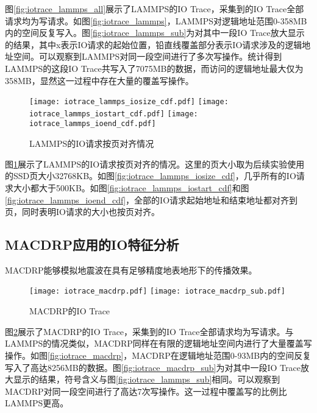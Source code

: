 图\ref{fig:iotrace_lammps_all}展示了LAMMPS的IO Trace，采集到的IO Trace全部请求均为写请求。如图\ref{fig:iotrace_lammps}，LAMMPS对逻辑地址范围0-358MB内的空间反复写入。图\ref{fig:iotrace_lammps_sub}为对其中一段IO Trace放大显示的结果，其中x表示IO请求的起始位置，铅直线覆盖部分表示IO请求涉及的逻辑地址空间。可以观察到LAMMPS对同一段空间进行了多次写操作。统计得到LAMMPS的这段IO Trace共写入了7075MB的数据，而访问的逻辑地址最大仅为358MB，显然这一过程中存在大量的覆盖写操作。

\begin{figure}[H]
  \centering
    {\texttt{[image: iotrace\_lammps\_iosize\_cdf.pdf]}}
  \hspace{1em}
      {\texttt{[image: iotrace\_lammps\_iostart\_cdf.pdf]}}
      \hspace{1em}
          {\texttt{[image: iotrace\_lammps\_ioend\_cdf.pdf]}}
  \caption{LAMMPS的IO请求按页对齐情况}
  \label{fig:iotrace_lammps_iocdf}
\end{figure}
图\ref{fig:iotrace_lammps_iocdf}展示了LAMMPS的IO请求按页对齐的情况。这里的页大小取为后续实验使用的SSD页大小32768KB。如图\ref{fig:iotrace_lammps_iosize_cdf}，几乎所有的IO请求大小都大于500KB。如图\ref{fig:iotrace_lammps_iostart_cdf}和图\ref{fig:iotrace_lammps_ioend_cdf}，全部的IO请求起始地址和结束地址都对齐到页，同时表明IO请求的大小也按页对齐。

\subsection{MACDRP应用的IO特征分析}
\label{ssc:ioana}
MACDRP能够模拟地震波在具有足够精度地表地形下的传播效果。
\begin{figure}[H]
  \centering
    {\texttt{[image: iotrace\_macdrp.pdf]}}
  \hspace{4em}
      {\texttt{[image: iotrace\_macdrp\_sub.pdf]}}
  \caption{MACDRP的IO Trace}
  \label{fig:iotrace_macdrp_all}
\end{figure}
图\ref{fig:iotrace_macdrp_all}展示了MACDRP的IO Trace，采集到的IO Trace全部请求均为写请求。与LAMMPS的情况类似，MACDRP同样在有限的逻辑地址空间内进行了大量覆盖写操作。如图\ref{fig:iotrace_macdrp}，MACDRP在逻辑地址范围0-93MB内的空间反复写入了高达8256MB的数据。图\ref{fig:iotrace_macdrp_sub}为对其中一段IO Trace放大显示的结果，符号含义与图\ref{fig:iotrace_lammps_sub}相同。可以观察到MACDRP对同一段空间进行了高达7次写操作。这一过程中覆盖写的比例比LAMMPS更高。


